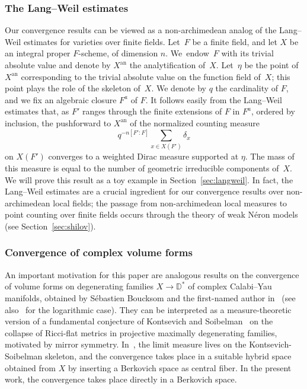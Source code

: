 \documentclass[11pt]{article}
\theoremstyle{definition}
\numberwithin{equation}{subsection}
\newcommand{\an}{\mathrm{an}}
\begin{document}
\subsubsection*{The Lang--Weil estimates}
Our convergence results can be viewed as a non-archimedean analog of the Lang--Weil estimates
for varieties over finite fields. Let~$F$ be a finite field, and let $X$ be an integral proper $F$-scheme, of dimension $n$. We~endow~$F$ with its trivial absolute value and denote by $X^{\an}$ the analytification of~$X$. Let~$\eta$ be the point of $X^{\an}$ corresponding to the trivial absolute value on the function field of~$X$; this point plays the role of the skeleton of~$X$.
We denote by $q$ the cardinality of $F$, and we fix an algebraic closure $F^a$ of $F$. It follows easily from the Lang--Weil estimates that, as $F'$ ranges through the finite extensions of $F$ in $F^a$, ordered by inclusion, the pushforward to $X^{\an}$ of the normalized counting measure
\[
q^{-n[F'\colon F]}\sum_{x\in X(F')}\delta_x
\]
on $X(F')$ converges to a weighted Dirac measure supported at $\eta$. The mass of this measure
is equal to the number of geometric irreducible components of~$X$. We will prove this result as a toy example in Section~\ref{sec:langweil}. In fact, the Lang--Weil estimates are a crucial ingredient for our convergence results over non-archimedean local fields; the passage from non-archimedean local measures to point counting over finite fields occurs through the theory of weak Néron models (see Section~\ref{sec:shilov}).

\subsubsection*{Convergence of complex volume forms}
An important motivation for this paper are analogous results on the convergence of volume forms on degenerating families $X\to\mathbb{D}^*$ of complex Calabi--Yau manifolds, obtained by Sébastien Boucksom and the first-named author in~\cite{BJ} (see also~\cite{Sh19} for the logarithmic case). They can be interpreted as a measure-theoretic version of a fundamental conjecture of Kontsevich and Soibelman~\cite{KS} on the collapse of Ricci-flat metrics in projective maximally degenerating families, motivated by mirror symmetry. In~\cite{BJ}, the limit measure lives on the Kontsevich-Soibelman skeleton, and the convergence takes place in a suitable hybrid space obtained from $X$ by inserting a Berkovich space as central fiber.
In the present work, the convergence takes place directly in a Berkovich space.
\end{document}
